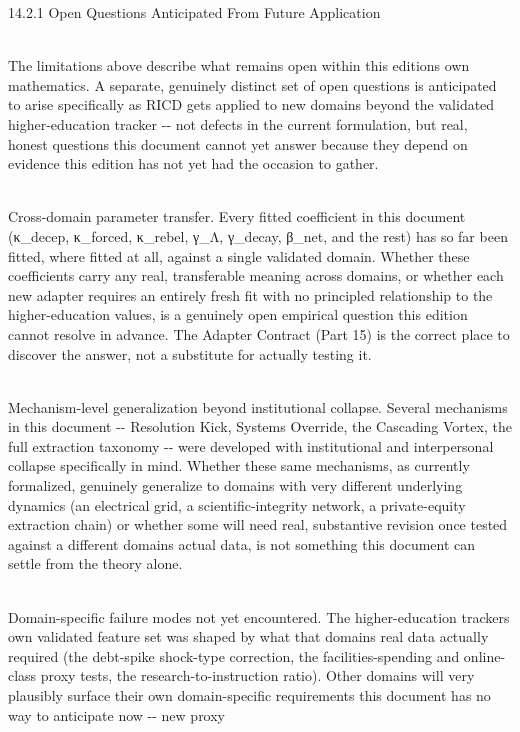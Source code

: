 \documentclass[
]{article}
\begin{document}
14.2.1 Open Questions Anticipated From Future Application\\
\strut \\
The limitations above describe what remains open within this
edition\textquotesingle s own mathematics. A separate, genuinely
distinct set of open questions is anticipated to arise specifically as
RICD gets applied to new domains beyond the validated higher-education
tracker -\/- not defects in the current formulation, but real, honest
questions this document cannot yet answer because they depend on
evidence this edition has not yet had the occasion to gather.\\
\strut \\
Cross-domain parameter transfer. Every fitted coefficient in this
document (κ\_decep, κ\_forced, κ\_rebel, γ\_Λ, γ\_decay, β\_net, and the
rest) has so far been fitted, where fitted at all, against a single
validated domain. Whether these coefficients carry any real,
transferable meaning across domains, or whether each new adapter
requires an entirely fresh fit with no principled relationship to the
higher-education values, is a genuinely open empirical question this
edition cannot resolve in advance. The Adapter Contract (Part 15) is the
correct place to discover the answer, not a substitute for actually
testing it.\\
\strut \\
Mechanism-level generalization beyond institutional collapse. Several
mechanisms in this document -\/- Resolution Kick, Systems Override, the
Cascading Vortex, the full extraction taxonomy -\/- were developed with
institutional and interpersonal collapse specifically in mind. Whether
these same mechanisms, as currently formalized, genuinely generalize to
domains with very different underlying dynamics (an electrical grid, a
scientific-integrity network, a private-equity extraction chain) or
whether some will need real, substantive revision once tested against a
different domain\textquotesingle s actual data, is not something this
document can settle from the theory alone.\\
\strut \\
Domain-specific failure modes not yet encountered. The higher-education
tracker\textquotesingle s own validated feature set was shaped by what
that domain\textquotesingle s real data actually required (the
debt-spike shock-type correction, the facilities-spending and
online-class proxy tests, the research-to-instruction ratio). Other
domains will very plausibly surface their own domain-specific
requirements this document has no way to anticipate now -\/- new proxy
\end{document}
